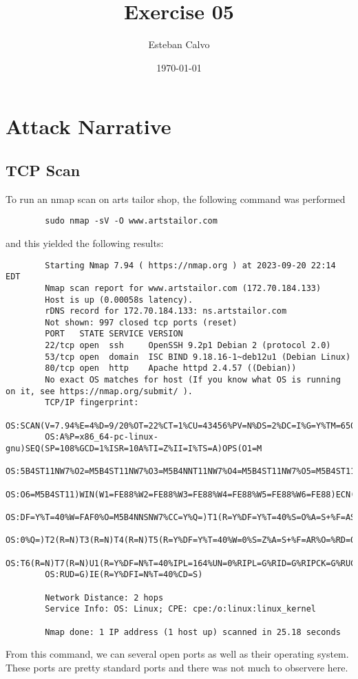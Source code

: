 \documentclass[notitlepage]{article}
\begin{document}
  
\title{Exercise 05}
\author{Esteban Calvo}
\date{\isodate\today}

\maketitle

\tableofcontents

\newpage


\section{Attack Narrative}

\subsection{TCP Scan}
    To run an nmap scan on arts tailor shop, the following command was performed
    \begin{verbatim}
        sudo nmap -sV -O www.artstailor.com
    \end{verbatim}
    and this yielded the following results:
    \begin{verbatim}
        Starting Nmap 7.94 ( https://nmap.org ) at 2023-09-20 22:14 EDT
        Nmap scan report for www.artstailor.com (172.70.184.133)
        Host is up (0.00058s latency).
        rDNS record for 172.70.184.133: ns.artstailor.com
        Not shown: 997 closed tcp ports (reset)
        PORT   STATE SERVICE VERSION
        22/tcp open  ssh     OpenSSH 9.2p1 Debian 2 (protocol 2.0)
        53/tcp open  domain  ISC BIND 9.18.16-1~deb12u1 (Debian Linux)
        80/tcp open  http    Apache httpd 2.4.57 ((Debian))
        No exact OS matches for host (If you know what OS is running on it, see https://nmap.org/submit/ ).
        TCP/IP fingerprint:
        OS:SCAN(V=7.94%E=4%D=9/20%OT=22%CT=1%CU=43456%PV=N%DS=2%DC=I%G=Y%TM=650BA70
        OS:A%P=x86_64-pc-linux-gnu)SEQ(SP=108%GCD=1%ISR=10A%TI=Z%II=I%TS=A)OPS(O1=M
        OS:5B4ST11NW7%O2=M5B4ST11NW7%O3=M5B4NNT11NW7%O4=M5B4ST11NW7%O5=M5B4ST11NW7%
        OS:O6=M5B4ST11)WIN(W1=FE88%W2=FE88%W3=FE88%W4=FE88%W5=FE88%W6=FE88)ECN(R=Y%
        OS:DF=Y%T=40%W=FAF0%O=M5B4NNSNW7%CC=Y%Q=)T1(R=Y%DF=Y%T=40%S=O%A=S+%F=AS%RD=
        OS:0%Q=)T2(R=N)T3(R=N)T4(R=N)T5(R=Y%DF=Y%T=40%W=0%S=Z%A=S+%F=AR%O=%RD=0%Q=)
        OS:T6(R=N)T7(R=N)U1(R=Y%DF=N%T=40%IPL=164%UN=0%RIPL=G%RID=G%RIPCK=G%RUCK=G%
        OS:RUD=G)IE(R=Y%DFI=N%T=40%CD=S)

        Network Distance: 2 hops
        Service Info: OS: Linux; CPE: cpe:/o:linux:linux_kernel
        
        Nmap done: 1 IP address (1 host up) scanned in 25.18 seconds
    \end{verbatim}
    From this command, we can several open ports as well as their operating system. These ports are
    pretty standard ports and there was not much to observere here.
\end{document}
